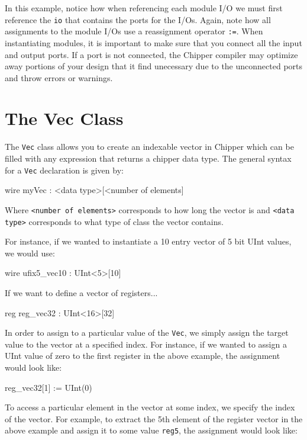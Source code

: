 In this example, notice how when referencing each module I/O we must first reference the \verb+io+ that contains the ports for the I/Os. Again, note how all assignments to the module I/Os use a reassignment operator \verb+:=+. When instantiating modules, it is important to make sure that you connect all the input and output ports. If a port is not connected, the Chipper compiler may optimize away portions of your design that it find unecessary due to the unconnected ports and throw errors or warnings.

\section{The Vec Class}

The \verb+Vec+ class allows you to create an indexable vector in Chipper which can be filled with any expression that returns a chipper data type. The general syntax for a \verb+Vec+ declaration is given by:
\begin{stanza}
wire myVec : <data type>[<number of elements]
\end{stanza}
Where \verb+<number of elements>+ corresponds to how long the vector is and \verb+<data type>+ corresponds to what type of class the vector contains.

For instance, if we wanted to instantiate a 10 entry vector of 5 bit UInt values, we would use:

\begin{stanza}
wire ufix5_vec10 : UInt<5>[10]
\end{stanza}

If we want to define a vector of registers...

\begin{stanza}
reg reg_vec32 : UInt<16>[32]
\end{stanza}

In order to assign to a particular value of the \verb+Vec+, we simply assign the target value to the vector at a specified index. For instance, if we wanted to assign a UInt value of zero to the first register in the above example, the assignment would look like:

\begin{stanza}
reg_vec32[1] := UInt(0)
\end{stanza}

To access a particular element in the vector at some index, we specify the index of the vector. For example, to extract the 5th element of the register vector in the above example and assign it to some value \verb+reg5+, the assignment would look like:


